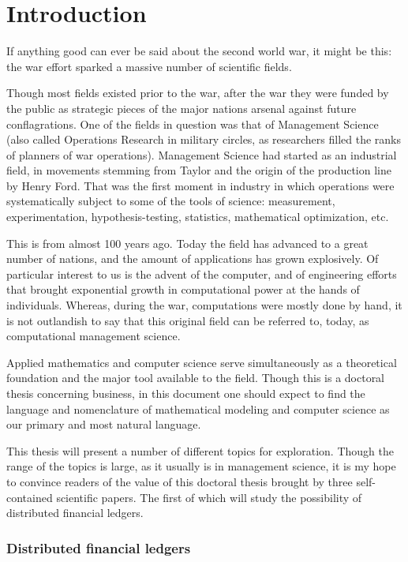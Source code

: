 \chapter{Introduction}
\bigskip

\noindent If anything good can ever be said about the second world war, it might be this: the war effort sparked a massive number of scientific fields.

Though most fields existed prior to the war, after the war they were funded by the public as strategic pieces of the major nations arsenal against future conflagrations. One of the fields in question was that of Management Science (also called Operations Research in military circles, as researchers filled the ranks of planners of war operations). Management Science had started as an industrial field, in movements stemming from Taylor and the origin of the production line by Henry Ford.  That was the first moment in industry in which operations were systematically subject to some of the tools of science: measurement, experimentation, hypothesis-testing, statistics, mathematical optimization, etc.

This is from almost 100 years ago. Today the field has advanced to a great number of nations, and the amount of applications has grown explosively.  Of particular interest to us is the advent of the computer, and of engineering efforts that brought exponential growth in computational power at the hands of individuals.  Whereas, during the war, computations were mostly done by hand, it is not outlandish to say that this original field can be referred to, today, as computational management science.

Applied mathematics and computer science serve simultaneously as a theoretical foundation and the major tool available to the field.  Though this is a doctoral thesis concerning business, in this document one should expect to find the language and nomenclature of mathematical modeling and computer science as our primary and most natural language.

This thesis will present a number of different topics for exploration. Though the range of the topics is large, as it usually is in management science, it is my hope to convince readers of the value of this doctoral thesis brought by three self-contained scientific papers.  The first of which will study the possibility of distributed financial ledgers.

\subsection{Distributed financial ledgers}

